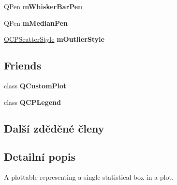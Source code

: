 \begin{DoxyCompactItemize}
\item 
\hypertarget{classQCPStatisticalBox_aa719b1d722a9f82364df1497a6dc1da8}{}Q\+Pen {\bfseries m\+Whisker\+Bar\+Pen}\label{classQCPStatisticalBox_aa719b1d722a9f82364df1497a6dc1da8}

\item 
\hypertarget{classQCPStatisticalBox_a1af5b601049c575f778ae270f40c9443}{}Q\+Pen {\bfseries m\+Median\+Pen}\label{classQCPStatisticalBox_a1af5b601049c575f778ae270f40c9443}

\item 
\hypertarget{classQCPStatisticalBox_ae102e4187e1e6ba1f2df0f622b5171a4}{}\hyperlink{classQCPScatterStyle}{Q\+C\+P\+Scatter\+Style} {\bfseries m\+Outlier\+Style}\label{classQCPStatisticalBox_ae102e4187e1e6ba1f2df0f622b5171a4}

\end{DoxyCompactItemize}
\subsection*{Friends}
\begin{DoxyCompactItemize}
\item 
\hypertarget{classQCPStatisticalBox_a1cdf9df76adcfae45261690aa0ca2198}{}class {\bfseries Q\+Custom\+Plot}\label{classQCPStatisticalBox_a1cdf9df76adcfae45261690aa0ca2198}

\item 
\hypertarget{classQCPStatisticalBox_a8429035e7adfbd7f05805a6530ad5e3b}{}class {\bfseries Q\+C\+P\+Legend}\label{classQCPStatisticalBox_a8429035e7adfbd7f05805a6530ad5e3b}

\end{DoxyCompactItemize}
\subsection*{Další zděděné členy}


\subsection{Detailní popis}
A plottable representing a single statistical box in a plot. 



